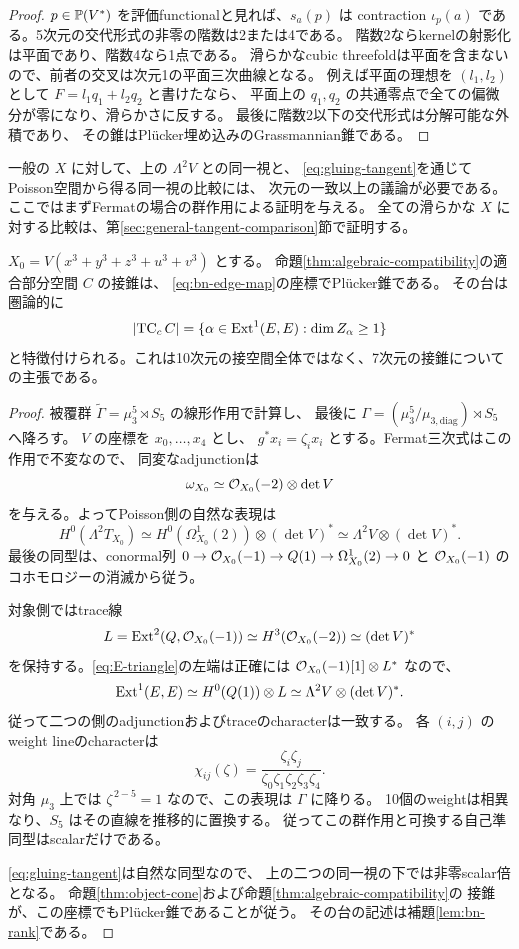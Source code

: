 \begin{proof}
$p\in\mathbb P(V^*)$ を評価functionalと見れば、$s_a(p)$ は contraction
$\iota_p(a)$ である。5次元の交代形式の非零の階数は2または4である。
階数2ならkernelの射影化は平面であり、階数4なら1点である。
滑らかなcubic threefoldは平面を含まないので、前者の交叉は次元1の平面三次曲線となる。
例えば平面の理想を $(l_1,l_2)$ として $F=l_1q_1+l_2q_2$ と書けたなら、
平面上の $q_1,q_2$ の共通零点で全ての偏微分が零になり、滑らかさに反する。
最後に階数2以下の交代形式は分解可能な外積であり、
その錐はPl\"ucker埋め込みのGrassmannian錐である。
\end{proof}

一般の $X$ に対して、上の $\Lambda^2V$ との同一視と、
\eqref{eq:gluing-tangent}を通じてPoisson空間から得る同一視の比較には、
次元の一致以上の議論が必要である。
ここではまずFermatの場合の群作用による証明を与える。
全ての滑らかな $X$ に対する比較は、第\ref{sec:general-tangent-comparison}節で証明する。

\begin{theorem}\label{thm:fermat-bn-cone}
$X_0=V(x^3+y^3+z^3+u^3+v^3)$ とする。
命題\ref{thm:algebraic-compatibility}の適合部分空間 $C$ の接錐は、
\eqref{eq:bn-edge-map}の座標でPl\"ucker錐である。
その台は圏論的に
\[
 \left|\operatorname{TC}_cC\right|
 =\{\alpha\in\operatorname{Ext}^1(E,E):\dim Z_\alpha\ge1\}
\]
と特徴付けられる。これは10次元の接空間全体ではなく、7次元の接錐についての主張である。
\end{theorem}

\begin{proof}
被覆群
$\widetilde\Gamma=\mu_3^5\rtimes S_5$ の線形作用で計算し、
最後に $\Gamma=(\mu_3^5/\mu_{3,\mathrm{diag}})\rtimes S_5$ へ降ろす。
$V$ の座標を $x_0,\ldots,x_4$ とし、
$g^*x_i=\zeta_i x_i$ とする。Fermat三次式はこの作用で不変なので、
同変なadjunctionは
\[
 \omega_{X_0}\simeq\mathcal O_{X_0}(-2)\otimes\det V
\]
を与える。よってPoisson側の自然な表現は
\[
 H^0(\Lambda^2T_{X_0})
 \simeq H^0(\Omega^1_{X_0}(2))\otimes(\det V)^*
 \simeq\Lambda^2V\otimes(\det V)^*.
\]
最後の同型は、conormal列
$0\to\mathcal O_{X_0}(-1)\to Q(1)\to\Omega^1_{X_0}(2)\to0$
と $\mathcal O_{X_0}(-1)$ のコホモロジーの消滅から従う。

対象側ではtrace線
\[
 L=\operatorname{Ext}^2(Q,\mathcal O_{X_0}(-1))
   \simeq H^3(\mathcal O_{X_0}(-2))
   \simeq(\det V)^*
\]
を保持する。\eqref{eq:E-triangle}の左端は正確には
$\mathcal O_{X_0}(-1)[1]\otimes L^*$ なので、
\[
 \operatorname{Ext}^1(E,E)
 \simeq H^0(Q(1))\otimes L
 \simeq\Lambda^2V\otimes(\det V)^*.
\]
従って二つの側のadjunctionおよびtraceのcharacterは一致する。
各 $(i,j)$ のweight lineのcharacterは
\[
 \chi_{ij}(\zeta)
  =\frac{\zeta_i\zeta_j}{\zeta_0\zeta_1\zeta_2\zeta_3\zeta_4}.
\]
対角 $\mu_3$ 上では $\zeta^{\,2-5}=1$ なので、この表現は $\Gamma$ に降りる。
10個のweightは相異なり、$S_5$ はその直線を推移的に置換する。
従ってこの群作用と可換する自己準同型はscalarだけである。

\eqref{eq:gluing-tangent}は自然な同型なので、
上の二つの同一視の下では非零scalar倍となる。
命題\ref{thm:object-cone}および命題\ref{thm:algebraic-compatibility}の
接錐が、この座標でもPl\"ucker錐であることが従う。
その台の記述は補題\ref{lem:bn-rank}である。
\end{proof}

